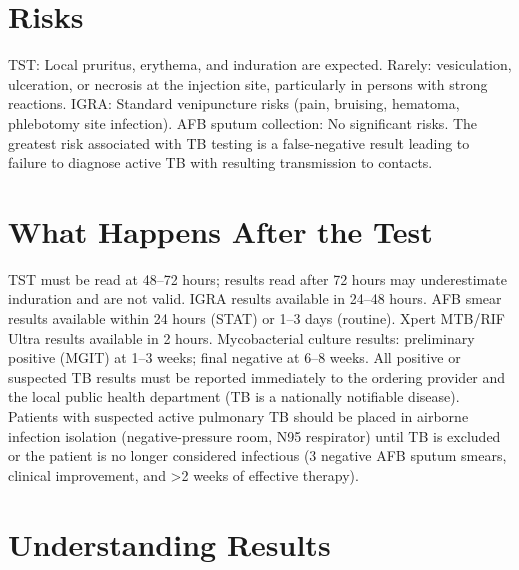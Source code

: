 \section*{Risks}
TST: Local pruritus, erythema, and induration are expected. Rarely: vesiculation, ulceration, or necrosis at the injection site, particularly in persons with strong reactions. IGRA: Standard venipuncture risks (pain, bruising, hematoma, phlebotomy site infection). AFB sputum collection: No significant risks. The greatest risk associated with TB testing is a false-negative result leading to failure to diagnose active TB with resulting transmission to contacts.

\section*{What Happens After the Test}
TST must be read at 48--72 hours; results read after 72 hours may underestimate induration and are not valid. IGRA results available in 24--48 hours. AFB smear results available within 24 hours (STAT) or 1--3 days (routine). Xpert MTB/RIF Ultra results available in 2 hours. Mycobacterial culture results: preliminary positive (MGIT) at 1--3 weeks; final negative at 6--8 weeks. All positive or suspected TB results must be reported immediately to the ordering provider and the local public health department (TB is a nationally notifiable disease). Patients with suspected active pulmonary TB should be placed in airborne infection isolation (negative-pressure room, N95 respirator) until TB is excluded or the patient is no longer considered infectious (3 negative AFB sputum smears, clinical improvement, and >2 weeks of effective therapy).

\section*{Understanding Results}

